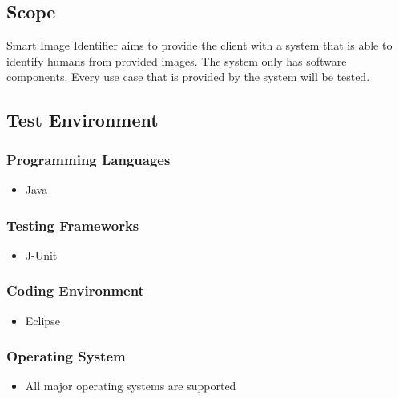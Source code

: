 \documentclass[a4paper,12pt]{report}
\begin{document}
	\subsection {Scope}
		Smart Image Identifier aims to provide the client with a system that is able to identify humans from provided images. The system only has software components.
		Every use case that is provided by the system will be tested.
	\subsection {Test Environment}
		\subsubsection{Programming Languages}
			\begin {itemize}
				\item Java
			\end {itemize}
		\subsubsection{Testing Frameworks}
			\begin {itemize}
				\item J-Unit
			\end {itemize}
		\subsubsection{Coding Environment}
			\begin {itemize}
				\item Eclipse
			\end {itemize}
		\subsubsection{Operating System}
			\begin {itemize}
				\item All major operating systems are supported
			\end {itemize}
	
	\newpage
\end{document}
